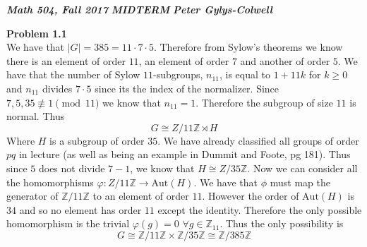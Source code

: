 \documentclass[12pt]{article}
\newenvironment{ques}[1]{\textbf{Problem #1}\vspace{1 mm}\\ }{\bigskip}
\theoremstyle{definition}
\newcommand{\Z}{\mathbb Z}
\begin{document}
\noindent \textit{\textbf{Math 504, Fall 2017}} \hspace{1.3cm}
\textit{\textbf{MIDTERM}} \hspace{1.3cm} \textit{\textbf{Peter
Gylys-Colwell}} 

\vspace{1cm}

\begin{ques}{1.1}
	We have that $|G| = 385 = 11 \cdot 7 \cdot 5$. Therefore from Sylow's theorems we
	know there is an element of order $11$, an element of order $7$ and another
	of order $5$. We have that the number of Sylow $11$-subgroups, $n_{11}$, is
	equal to $1 + 11k$ for $k \geq 0$ and $n_{11}$ divides $7 \cdot 5$ since
	its the index of the normalizer. Since $7,5,35 \not \equiv 1 \pmod {11}$ we
	know that $n_{11} = 1$. Therefore the subgroup of size $11$ is normal. Thus
	$$G \cong  Z/ 11\Z \rtimes H$$
	Where $H$ is a subgroup of order $35$. We have already classified all
	groups of order $pq$ in lecture (as well as being an example in Dummit and
	Foote, pg 181). Thus since $5$ does not divide $7 - 1$, we know that $H \cong
	Z/35\Z$.
	Now we can consider all the homomorphisms $\varphi :Z/11\Z \to
	\text{Aut}(H)$. We have that $\phi$ must map the generator of $\Z/11\Z$ to an
	element of order $11$. However the order of $\text{Aut}(H)$ is $34$ and so
	no element has order $11$ except the identity. Therefore the only possible
	homomorphism is the trivial $\varphi(g) = 0$ $\forall g \in \Z_{11}$. Thus
	the only possibility is
	$$G \cong \Z/11\Z \times \Z/35\Z \cong \Z/385\Z$$
\end{ques}
\end{document}
